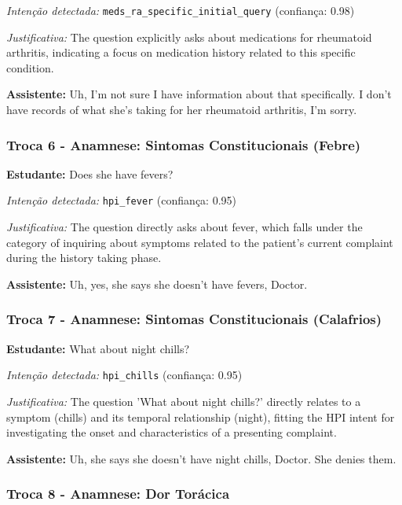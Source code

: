 \textit{Intenção detectada:} \texttt{meds\_ra\_specific\_initial\_query} (confiança: 0.98)

\textit{Justificativa:} The question explicitly asks about medications for rheumatoid arthritis, indicating a focus on medication history related to this specific condition.

\textbf{Assistente:} Uh, I'm not sure I have information about that specifically. I don't have records of what she's taking for her rheumatoid arthritis, I'm sorry.

\vspace{0.5cm}

\subsubsection*{Troca 6 - Anamnese: Sintomas Constitucionais (Febre)}

\textbf{Estudante:} Does she have fevers?

\textit{Intenção detectada:} \texttt{hpi\_fever} (confiança: 0.95)

\textit{Justificativa:} The question directly asks about fever, which falls under the category of inquiring about symptoms related to the patient's current complaint during the history taking phase.

\textbf{Assistente:} Uh, yes, she says she doesn't have fevers, Doctor.

\vspace{0.5cm}

\subsubsection*{Troca 7 - Anamnese: Sintomas Constitucionais (Calafrios)}

\textbf{Estudante:} What about night chills?

\textit{Intenção detectada:} \texttt{hpi\_chills} (confiança: 0.95)

\textit{Justificativa:} The question 'What about night chills?' directly relates to a symptom (chills) and its temporal relationship (night), fitting the HPI intent for investigating the onset and characteristics of a presenting complaint.

\textbf{Assistente:} Uh, she says she doesn't have night chills, Doctor. She denies them.

\vspace{0.5cm}

\subsubsection*{Troca 8 - Anamnese: Dor Torácica}

